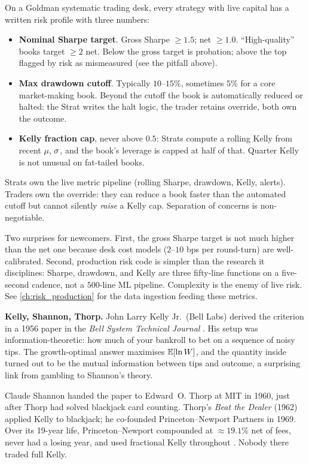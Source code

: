 \begin{gsbox}
\label{sec:kelly_gs}
On a Goldman systematic trading desk, every strategy with live
capital has a written risk profile with three numbers:
\begin{itemize}
  \item \textbf{Nominal Sharpe target}. Gross Sharpe $\geq 1.5$;
  net $\geq 1.0$. ``High-quality'' books target $\geq 2$ net.
  Below the gross target is probation; above the top flagged by
  risk as mismeasured (see the pitfall above).
  \item \textbf{Max drawdown cutoff}. Typically $10$--$15\%$,
  sometimes $5\%$ for a core market-making book. Beyond the
  cutoff the book is automatically reduced or halted: the Strat
  writes the halt logic, the trader retains override, both own
  the outcome.
  \item \textbf{Kelly fraction cap}, never above $0.5$: Strats
  compute a rolling Kelly from recent $\mu$, $\sigma$, and the
  book's leverage is capped at half of that. Quarter Kelly is
  not unusual on fat-tailed books.
\end{itemize}
Strats own the live metric pipeline (rolling Sharpe, drawdown,
Kelly, alerts). Traders own the override: they can reduce a book
faster than the automated cutoff but cannot silently \emph{raise}
a Kelly cap. Separation of concerns is non-negotiable.

Two surprises for newcomers. First, the gross Sharpe target is
not much higher than the net one because desk cost models
($2$--$10$ bps per round-turn) are well-calibrated. Second,
production risk code is simpler than the research it disciplines:
Sharpe, drawdown, and Kelly are three fifty-line functions on a
five-second cadence, not a $500$-line ML pipeline. Complexity is
the enemy of live risk. See \cref{ch:risk_production} for the
data ingestion feeding these metrics.
\end{gsbox}

\begin{historybox}
\textbf{Kelly, Shannon, Thorp.} John Larry Kelly Jr.\ (Bell Labs)
derived the criterion in a 1956 paper in the \emph{Bell System
Technical Journal} \citep{kelly1956new}. His setup was
information-theoretic: how much of your bankroll to bet on a
sequence of noisy tips. The growth-optimal answer maximises
$\mathbb{E}[\ln W]$, and the quantity inside turned out to be the mutual
information between tips and outcome, a surprising link from
gambling to Shannon's theory.

Claude Shannon handed the paper to Edward~O. Thorp at MIT in
1960, just after Thorp had solved blackjack card counting.
Thorp's \emph{Beat the Dealer} (1962) applied Kelly to blackjack;
he co-founded Princeton--Newport Partners in 1969. Over its
19-year life, Princeton--Newport compounded at $\approx 19.1\%$
net of fees, never had a losing year, and used fractional Kelly
throughout \citeThorp. Nobody there traded full Kelly.
\end{historybox}

